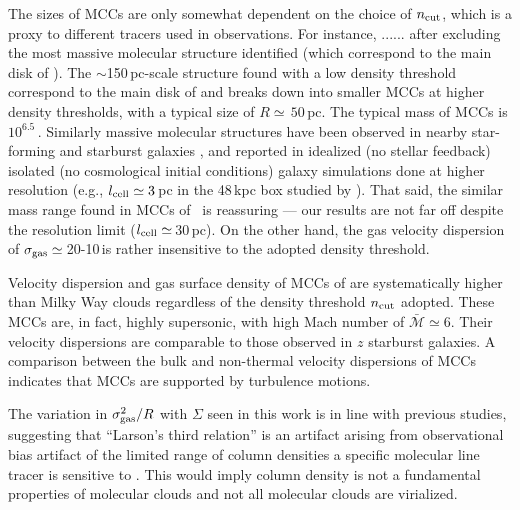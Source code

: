 \IfFileExists{emulateapjlegacy.cls}{\documentclass[iop]{emulateapjlegacy}}{\documentclass[iop]{emulateapj}}
\begin{document}
The sizes of MCCs are only somewhat dependent on the choice of $n_{\rm cut}$, which is a proxy to different tracers used in observations. 
For instance, ......
after excluding the 
most massive molecular structure identified (which correspond to the main disk of \flower). 
The $\sim$150\,pc-scale structure found with a low density threshold correspond to the main disk of \flower 
and breaks down into smaller MCCs at higher density thresholds, with a typical size of $R\simeq\,50$\,pc.
%
The typical mass of MCCs is $10^{6.5}$\,\Msun. Similarly massive molecular structures have been observed in nearby star-forming and starburst galaxies \citep[e.g.,][]{Keto05a, DonovanMeyer13a, Colombo14a, Leroy15a}, and reported in idealized (no stellar feedback) isolated (no cosmological initial conditions) galaxy simulations done at higher resolution (e.g., $l_{\rm cell}\simeq3$\,pc in the 48\,kpc box studied by \citealt{Behrendt16a}). That said, the similar mass range found in MCCs of \flower\ is reassuring --- our results are not far off despite the resolution limit ($l_{\rm cell}\simeq$\,30\,pc). On the other hand, the gas velocity dispersion 
of $\sigma_{\rm gas}\simeq$\,20-10\,\kms is rather insensitive to the adopted density threshold.

Velocity dispersion and gas surface density of MCCs of \flower are systematically higher than Milky Way clouds regardless of the density threshold $n_{\rm cut}$ adopted. These MCCs are, in fact, highly supersonic, with high Mach number of $\bar{\mathcal{M}}\simeq6$. Their velocity dispersions are comparable to those observed in $z$ starburst galaxies. A comparison between the bulk and non-thermal velocity dispersions of MCCs indicates that MCCs
are supported by turbulence motions.


The variation in $\sigma_{\rm gas}^2/R$ with $\Sigma$ seen in this work is in line with previous studies, suggesting that ``Larson's third relation'' is an artifact arising from observational bias artifact of the limited range of  column densities a specific molecular line tracer is sensitive to \citep[][]{Ballesteros02a, Ballesteros11a}. This would imply column density is not a fundamental properties of molecular clouds and not all molecular clouds are virialized. 
\end{document}
